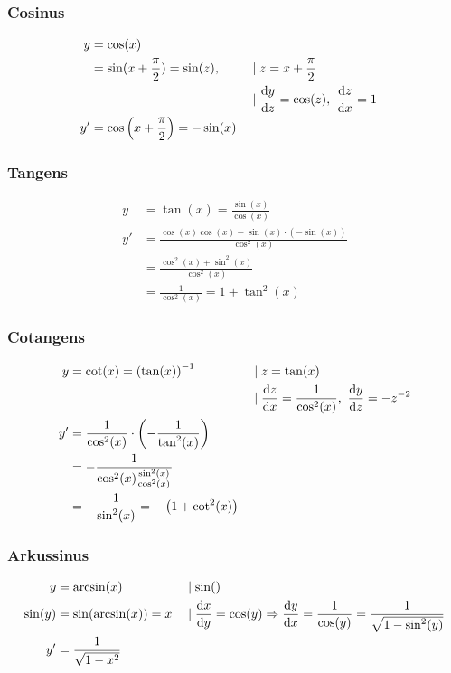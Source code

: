 \subsubsection{Cosinus}

\begin{align*}
    y &= \cos(x) \\
    &= \sin(x + \frac{\pi}{2}) = \sin(z), &&\mid z = x + \frac{\pi}{2} \\
    & &&\mid \frac{\mathop{}\!\mathrm{d} y}{\mathop{}\!\mathrm{d} z} = \cos(z),\ \frac{\mathop{}\!\mathrm{d} z}{\mathop{}\!\mathrm{d} x} = 1 \\
    y' &= \cos\left(x + \frac{\pi}{2}\right) = -\sin(x) 
\end{align*}

\subsubsection{Tangens}

\begin{align*}
    y &= \tan(x) = \frac{\sin(x)}{\cos(x)} \\
    y' &= \frac{\cos(x)\cos(x) - \sin(x)\cdot (-\sin(x))}{\cos^2(x)} \\
    &= \frac{\cos^2(x) + \sin^2(x)}{\cos^2(x)} \\
    &= \frac{1}{\cos^2(x)} = 1 + \tan^2(x)
\end{align*}

\subsubsection{Cotangens}

\begin{align*}
    y &= \cot(x) = {(\tan(x))}^{-1} &&\mid z = \tan(x) \\
    & &&\mid \frac{\diff z}{\diff x} = \frac{1}{\cos^2(x)},\ \frac{\diff y}{\diff z} = -z^{-2} \\
    y' &= \frac{1}{\cos^2(x)} \cdot \left( -\frac{1}{\tan^2(x)} \right) \\
    &= -\frac{1}{\cos^2(x) \frac{\sin^2(x)}{\cos^2(x)}} \\
    &= -\frac{1}{\sin^2(x)} = -\left( 1 + \cot^2(x) \right)
\end{align*}

\subsubsection{Arkussinus}

\begin{align*}
    y &= \arcsin(x) &&\mid \sin() \\
    \sin(y) &= \sin(\arcsin(x)) = x &&\mid \frac{\mathop{}\!\mathrm{d} x}{\mathop{}\!\mathrm{d} y} = \cos(y) \Rightarrow \frac{\mathop{}\!\mathrm{d} y}{\mathop{}\!\mathrm{d} x} = \frac{1}{\cos(y)} = \frac{1}{\sqrt{1 - \sin^2(y)}} \\
    y' &= \frac{1}{\sqrt{1 - x^2}}
\end{align*}

